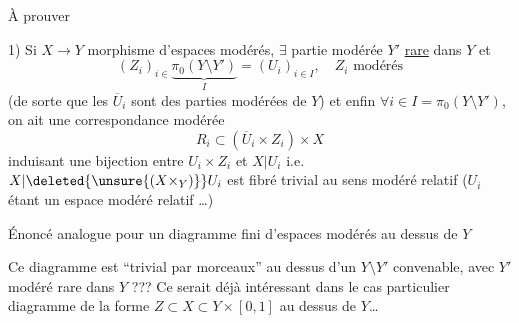 À prouver

1) Si $X\to Y$ morphisme d'espaces modérés, $\exists$ partie modérée $Y'$ \uline{rare} dans $Y$ et
\[
(Z_i)_{i\in}\underbrace{\pi_0(Y\setminus Y')}_{I}=(U_i)_{i\in I},\quad Z_i\text{ modérés}
\]
(de sorte que les $\overline U_i$ sont des parties modérées de $Y$) et enfin $\forall i\in I=\pi_0(Y\setminus Y')$, on ait une correspondance modérée
\[
R_i\subset(\overline U_i\times Z_i)\times X
\]
induisant une bijection entre $U_i\times Z_i$ et $X|U_i$ i.e. $X|\deleted{\unsure{(X\times_Y)}}U_i$ est fibré  trivial au sens modéré relatif ($U_i$ étant un espace modéré relatif \ldots)

Énoncé analogue pour un diagramme fini d'espaces modérés au dessus de $Y$ 

Ce diagramme est  ``trivial par morceaux'' au dessus d'un $Y\setminus Y'$ convenable, avec $Y'$ modéré rare dans $Y$ ??? Ce serait déjà intéressant dans le cas particulier  diagramme de la forme $Z\subset X\subset Y\times[0,1]$ \deleted{$\unsure{I\subset[0,}$} au dessus de $Y$\ldots

